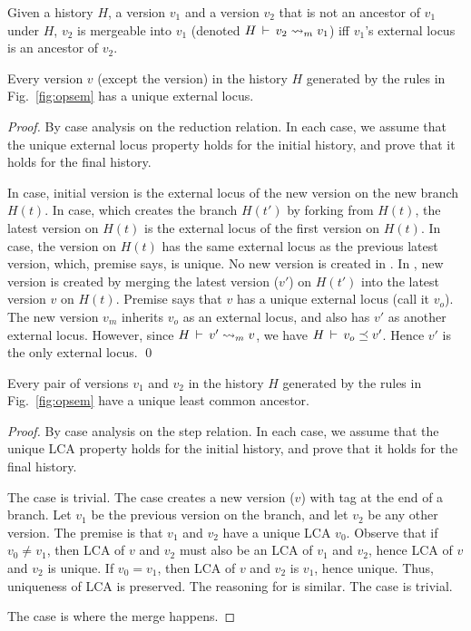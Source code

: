 \begin{definition} 
Given a history $H$, a version $v_1$ and a version $v_2$ that is not
an ancestor of $v_1$ under $H$, $v_2$ is mergeable into $v_1$ (denoted
$H\,\vdash\,v_2 \rightsquigarrow_m v_1$) iff $v_1$'s external locus is an
ancestor of $v_2$.
\end{definition}

\begin{lemma} 
Every version $v$ (except the  version) in the history $H$
generated by the rules in Fig.~\ref{fig:opsem} has a unique external
locus.
\end{lemma}
\begin{proof}
By case analysis on the reduction relation. In each case, we assume
that the unique external locus property holds for the initial history,
and prove that it holds for the final history.

In  case, initial version is the external locus of
the new version on the new branch $H(t)$. In  case,
which creates the branch $H(t')$ by forking from $H(t)$, the latest
version on $H(t)$ is the external locus of the first version on
$H(t)$. In  case, the version on $H(t)$ has the same
external locus as the previous latest version, which, premise says, is
unique. No new version is created in . In
, new version is created by merging the latest
version ($v'$) on $H(t')$ into the latest version $v$ on $H(t)$.
Premise says that $v$ has a unique external locus (call it $v_o$). The
new version $v_m$ inherits $v_o$ as an external locus, and also has
$v'$ as another external locus. However, since $H\,\vdash\,v' \rightsquigarrow_m
v$, we have $H\,\vdash\,v_o \preceq v'$. Hence $v'$ is the only
external locus.
\qed
\end{proof}

\begin{theorem} 
Every pair of versions $v_1$ and $v_2$ in the history $H$ generated by
the rules in Fig.~\ref{fig:opsem} have a unique least
common ancestor. 
\end{theorem}
\begin{proof}
By case analysis on the step relation. In each case, we assume that
the unique LCA property holds for the initial history, and prove that
it holds for the final history.

The  case is trivial. The  case
creates a new version ($v$) with  tag at the end of a branch.
Let $v_1$ be the previous version on the branch, and let $v_2$ be any
other version. The premise is that $v_1$ and $v_2$ have a unique LCA
$v_0$. Observe that if $v_0 \neq v_1$, then LCA of $v$ and $v_2$ must
also be an LCA of $v_1$ and $v_2$, hence LCA of $v$ and $v_2$ is
unique. If $v_0 = v_1$, then LCA of $v$ and $v_2$ is $v_1$, hence
unique. Thus, uniqueness of LCA is preserved. The reasoning for
 is similar. The  case is trivial. 

The  case is where the merge happens. 
\end{proof}

